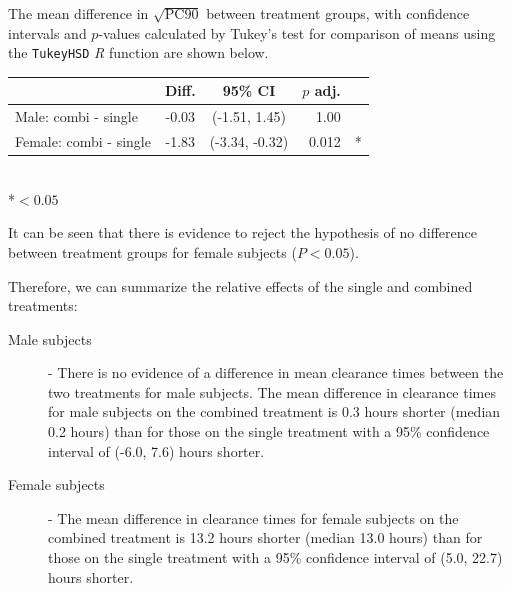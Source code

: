 The mean difference in $\sqrt{\mathrm{PC}90}$ between treatment groups, with confidence intervals and $p$-values calculated by Tukey's test for comparison of means \cite{montgomery} using the \texttt{TukeyHSD} \emph{R} function are shown below.
\begin{table}[h]
\centering
\begin{tabular}{l|ccrl}
&Diff.&95\% CI&$p$ adj.&\\
\hline
Male: combi - single 	& -0.03 & (-1.51, 1.45) & 1.00 &\\
Female: combi - single	& -1.83 & (-3.34,  -0.32) & 0.012 &*\\
\end{tabular}\\
*$<0.05$
\end{table}

It can be seen that there is evidence to reject the hypothesis of no difference between treatment groups for female subjects ($P<0.05$).

\newpage
Therefore, we can summarize the relative effects of the single and combined treatments:
\begin{description}
\item[Male subjects] - There is no evidence of a difference in mean clearance times between the two treatments for male subjects. The mean difference in clearance times for male subjects on the combined treatment is 0.3 hours shorter (median 0.2 hours) than for those on the single treatment with a 95\% confidence interval of (-6.0, 7.6) hours shorter.
\item[Female subjects] - The mean difference in clearance times for female subjects on the combined treatment is 13.2 hours shorter (median 13.0 hours) than for those on the single treatment with a 95\% confidence interval of (5.0, 22.7) hours shorter.
\end{description}

